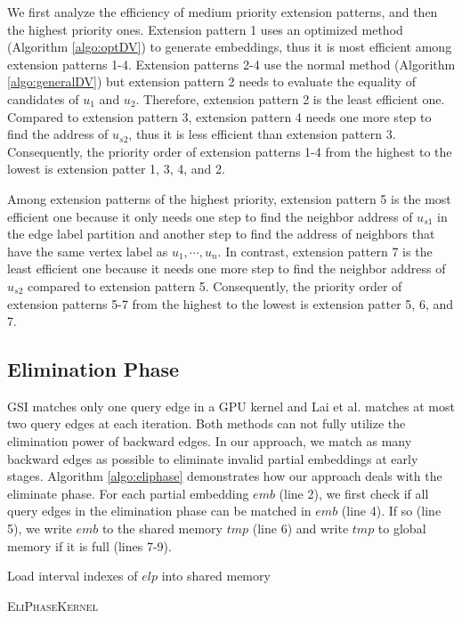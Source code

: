 We first analyze the efficiency of medium priority extension patterns, and then the highest priority ones. Extension pattern 1 uses an optimized method (Algorithm \ref{algo:optDV}) to generate embeddings, thus it is most efficient among extension patterns 1-4. Extension patterns 2-4 use the normal method (Algorithm \ref{algo:generalDV}) but extension pattern 2 needs to evaluate the equality of candidates of $u_1$ and $u_2$. Therefore, extension pattern 2 is the least efficient one. Compared to extension pattern 3, extension pattern 4 needs one more step to find the address of $u_{s2}$, thus it is less efficient than extension pattern 3. Consequently, the priority order of extension patterns 1-4 from the highest to the lowest is extension patter 1, 3, 4, and 2.

Among extension patterns of the highest priority, extension pattern 5 is the most efficient one because it only needs one step to find the neighbor address of $u_{s1}$ in the edge label partition and another step to find the address of neighbors that have the same vertex label as $u_1, \cdots, u_n$. In contrast, extension pattern 7 is the least efficient one because it needs one more step to find  the neighbor address of $u_{s2}$ compared to extension pattern 5. Consequently, the priority order of extension patterns 5-7 from the highest to the lowest is extension patter 5, 6, and 7.

\subsection{Elimination Phase} \label{sec:eliphase}
GSI \cite{zeng2020gsi} matches only one query edge in a GPU kernel and Lai et al. \cite{lai2015scalable} matches at most two query edges at each iteration. Both methods can not fully utilize the elimination power of backward edges. In our approach, we match as many backward edges as possible to eliminate invalid partial embeddings at early stages. Algorithm \ref{algo:eliphase} demonstrates how our approach deals with the eliminate phase. For each partial embedding $emb$ (line 2), we first check if all query edges in the elimination phase can be matched in $emb$ (line 4). If so (line 5), we write $emb$ to the shared memory $tmp$ (line 6) and write $tmp$ to global memory if it is full (lines 7-9).
\begin{algorithm}
Load interval indexes of $elp$ into shared memory\;
\caption{\textsc{EliPhaseKernel}}
\label{algo:eliphase}
\end{algorithm}



